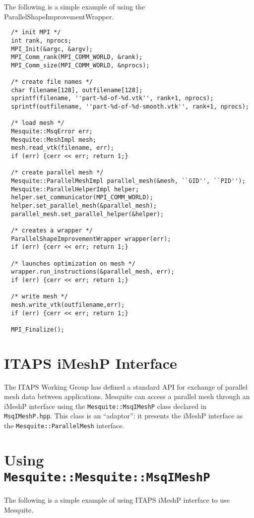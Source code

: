 The following is a simple example of using the ParallelShapeImprovementWrapper.

\begin{verbatim}
  /* init MPI */
  int rank, nprocs;
  MPI_Init(&argc, &argv);
  MPI_Comm_rank(MPI_COMM_WORLD, &rank);
  MPI_Comm_size(MPI_COMM_WORLD, &nprocs);

  /* create file names */
  char filename[128], outfilename[128];
  sprintf(filename, ''part-%d-of-%d.vtk'', rank+1, nprocs);
  sprintf(outfilename, ''part-%d-of-%d-smooth.vtk'', rank+1, nprocs);

  /* load mesh */
  Mesquite::MsqError err;
  Mesquite::MeshImpl mesh;
  mesh.read_vtk(filename, err);
  if (err) {cerr << err; return 1;}

  /* create parallel mesh */
  Mesquite::ParallelMeshImpl parallel_mesh(&mesh, ``GID'', ``PID'');
  Mesquite::ParallelHelperImpl helper;
  helper.set_communicator(MPI_COMM_WORLD);
  helper.set_parallel_mesh(&parallel_mesh);
  parallel_mesh.set_parallel_helper(&helper);

  /* creates a wrapper */
  ParallelShapeImprovementWrapper wrapper(err);
  if (err) {cerr << err; return 1;}

  /* launches optimization on mesh */
  wrapper.run_instructions(&parallel_mesh, err);
  if (err) {cerr << err; return 1;}

  /* write mesh */
  mesh.write_vtk(outfilename,err);
  if (err) {cerr << err; return 1;}

  MPI_Finalize();
\end{verbatim}

\section{ITAPS iMeshP Interface}

The ITAPS Working Group has defined a standard API for exchange of parallel mesh data between applications. Mesquite can access a parallel mesh through an iMeshP interface using the \texttt{Mesquite::MsqIMeshP} class declared in \texttt{MsqIMeshP.hpp}.  This class is an ``adaptor'':  it presents the iMeshP interface as the \texttt{Mesquite::ParallelMesh} interface.  

\section{Using \texttt{Mesquite::Mesquite::MsqIMeshP}}

The following is a simple example of using ITAPS iMeshP interface to use Mesquite.

